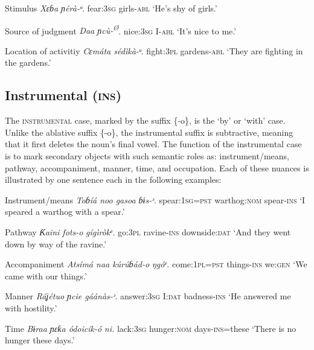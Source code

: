 Stimulus
\textit{Xɛɓa     ɲérà-}\textit{ᵒ}.
fear:\textsc{3sg}   girls-\textsc{abl}
‘He’s shy of girls.’




Source of judgment
\textit{Daa     ɲcù-}\textit{\textsuperscript{Ø}}.
nice:\textsc{3sg}   I-\textsc{abl}
‘It’s nice to me.’




Location of activitiy
\textit{Cɛmáta   sédìkà-}\textit{ᵒ}.
fight:\textsc{3pl}   gardens-\textsc{abl}
‘They are fighting in the gardens.’






\subsection{Instrumental (\textsc{ins})}


The \textsc{instrumental }case, marked by the suffix \{-o\}, is the ‘by’ or ‘with’ case. Unlike the ablative suffix \{-o\}, the instrumental suffix is subtractive, meaning that it first deletes the noun’s final vowel. The function of the instrumental case is to mark secondary objects with such semantic roles as: instrument/means, pathway, accompaniment, manner, time, and occupation. Each of these nuances is illustrated by one sentence each in the following examples:




Instrument/means
\textit{Toɓíá   noo     gasoa       ɓɨs-}\textit{ᵓ}.
spear:\textsc{1sg}=\textsc{pst}   warthog:\textsc{nom}   spear-\textsc{ins}
‘I speared a warthog with a spear.’




Pathway
\textit{Ƙaini     fots-}\textit{o}\textit{     gígìròkᵉ.}
go:\textsc{3pl}   ravine-\textsc{ins}   downside:\textsc{dat}
‘And they went down by way of the ravine.’



Accompaniment
\textit{Atsímá naa     kúrúɓád-}\textit{o}\textit{   ŋgóᵉ.}
come:\textsc{1pl}=\textsc{pst}   things-\textsc{ins}   we:\textsc{gen}
‘We came with our things.’




Manner
\textit{Ráʝétuo   ɲcie   gáánàs-}\textit{ᵓ}.
answer:\textsc{3sg}   I:\textsc{dat}   badness-\textsc{ins}
‘He answered me with hostility.’




Time
\textit{Bɨraa     ɲɛƙa     ódoicik-}\textit{ó}\textit{ ni.}
lack:\textsc{3sg}   hunger:\textsc{nom}   days-\textsc{ins}=these
‘There is no hunger these days.’




